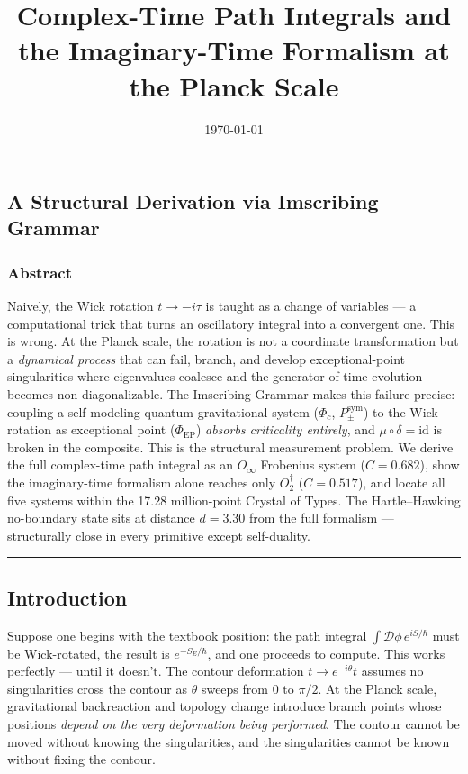 \documentclass[12pt,a4paper]{article}
\begin{document}
\title{Complex-Time Path Integrals and the Imaginary-Time Formalism at the Planck Scale}
\date{\today}

\maketitle

\subsection{A Structural Derivation via Imscribing Grammar}

\subsubsection{Abstract}

Naively, the Wick rotation $t \to -i\tau$ is taught as a change of variables --- a computational trick that turns an oscillatory integral into a convergent one. This is wrong. At the Planck scale, the rotation is not a coordinate transformation but a \emph{dynamical process} that can fail, branch, and develop exceptional-point singularities where eigenvalues coalesce and the generator of time evolution becomes non-diagonalizable. The Imscribing Grammar makes this failure precise: coupling a self-modeling quantum gravitational system ($\Phi_c$, $P_{\pm}^{\text{sym}}$) to the Wick rotation as exceptional point ($\Phi_{\text{EP}}$) \emph{absorbs criticality entirely}, and $\mu \circ \delta = \text{id}$ is broken in the composite. This is the structural measurement problem. We derive the full complex-time path integral as an $O_{\infty}$ Frobenius system ($C = 0.682$), show the imaginary-time formalism alone reaches only $O_2^\dagger$ ($C = 0.517$), and locate all five systems within the 17.28 million-point Crystal of Types. The Hartle--Hawking no-boundary state sits at distance $d = 3.30$ from the full formalism --- structurally close in every primitive except self-duality.

\begin{center}
\rule{0.5\textwidth}{0.4pt}
\end{center}

\subsection{Introduction}

Suppose one begins with the textbook position: the path integral $\int \mathcal{D}\phi\, e^{iS/\hbar}$ must be Wick-rotated, the result is $e^{-S_E/\hbar}$, and one proceeds to compute. This works perfectly --- until it doesn't. The contour deformation $t \to e^{-i\theta}t$ assumes no singularities cross the contour as $\theta$ sweeps from $0$ to $\pi/2$. At the Planck scale, gravitational backreaction and topology change introduce branch points whose positions \emph{depend on the very deformation being performed}. The contour cannot be moved without knowing the singularities, and the singularities cannot be known without fixing the contour.
\end{document}

